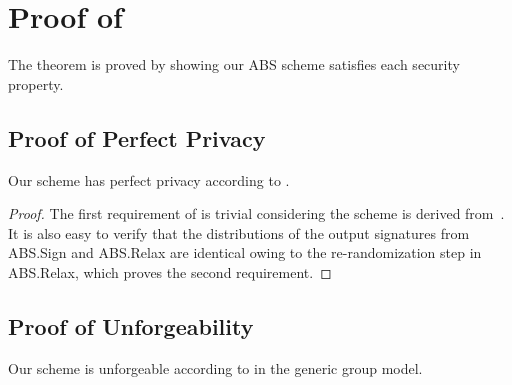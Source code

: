 \chapter{Proof of \texorpdfstring{}{Theorem~\ref{thm:access-control:abs-sec}}}%
\label{app:access-control-abs-sec}

\abssecuritytheorem*

The theorem is proved by showing our ABS scheme satisfies each security property.

\section{Proof of Perfect Privacy}

\begin{lemma}\label{lemma:access-control:abs-privacy}
  Our scheme has perfect privacy according to .
\end{lemma}

\begin{proof}
  The first requirement of  is trivial considering the scheme is derived from~\cite{10.1007/978-3-642-19074-2_24}. It is also easy to verify that the distributions of the output signatures from \textsf{ABS.Sign} and \textsf{ABS.Relax} are identical owing to the re-randomization step in \textsf{ABS.Relax}, which proves the second requirement.
\end{proof}

\section{Proof of Unforgeability}

\begin{lemma}\label{lemma:access-control:abs-unf}
  Our scheme is unforgeable according to  in the generic group model.
\end{lemma}

\newcommand{\Lin}{\textsf{Lin}}
\newcommand{\Hom}{\textsf{Hom}}

